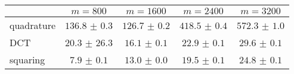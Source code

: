 \centering
\renewcommand{\arraystretch}{1.2}
\begin{tabular}{@{}lcccc@{}}
\toprule
 & $m=800$ & $m=1600$ & $m=2400$ & $m=3200$\\
\midrule
quadrature & $136.8$ $\pm$ $0.3$ & $126.7$ $\pm$ $0.2$ & $418.5$ $\pm$ $0.4$ & $572.3$ $\pm$ $1.0$ \\
DCT & $20.3$ $\pm$ $26.3$ & $16.1$ $\pm$ $0.1$ & $22.9$ $\pm$ $0.1$ & $29.6$ $\pm$ $0.1$ \\
squaring & $7.9$ $\pm$ $0.1$ & $13.0$ $\pm$ $0.0$ & $19.5$ $\pm$ $0.1$ & $24.8$ $\pm$ $0.1$ \\
\bottomrule
\end{tabular}
